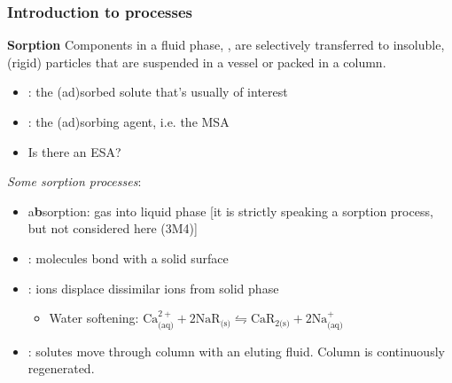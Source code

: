 \begin{frame}\frametitle{Introduction to \textbf{{\color{purple}{sorption}}} processes}
	\begin{exampleblock}{\textbf{Sorption}}
		Components in a fluid phase, {\color{myGreen}{solutes}}, are selectively transferred to insoluble, (rigid) particles that are suspended in a vessel or packed in a column.
	\end{exampleblock}
	\begin{itemize}
		\item	{\color{purple}{(ad)sorbate}}: the (ad)sorbed solute that's usually of interest
		\item	{\color{purple}{(ad)sorbent}}: the (ad)sorbing agent, i.e. the MSA
		\item	Is there an ESA?
	\end{itemize}

	\vspace{12pt}
	\emph{Some sorption processes}:
	\begin{itemize}
		\item	a\textbf{b}sorption: gas into liquid phase [it is strictly speaking a sorption process, but not considered here (3M4)]
		\item	{\color{purple}{adsorption}}: molecules bond with a solid {\color{red}surface}
		\item	{\color{purple}{ion-exchange}}: ions displace dissimilar ions from solid phase
			\begin{itemize}
				\item	Water softening: $\text{Ca}^{2+}_\text{(aq)} + 2\text{NaR}_\text{(s)} \leftrightharpoons \text{CaR}_{2\text{(s)}} + 2\text{Na}^{+}_\text{(aq)}$
			\end{itemize}
		\item	{\color{purple}{chromatography}}: solutes move through column with an eluting fluid. Column is continuously regenerated.
	\end{itemize}
\end{frame}

